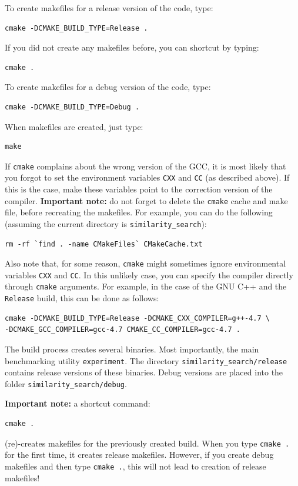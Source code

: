 \documentclass[runningheads,a4paper]{llncs}
\newcommand{\ttt}[1]{\texttt{#1}}
\begin{document}
{To create makefiles for a release version of the code, type:
\begin{verbatim}
cmake -DCMAKE_BUILD_TYPE=Release .
\end{verbatim}
If you did not create any makefiles before, you can shortcut by typing:
\begin{verbatim}
cmake . 
\end{verbatim}
To create makefiles for a debug version of the code, type:
\begin{verbatim}
cmake -DCMAKE_BUILD_TYPE=Debug .
\end{verbatim}
When makefiles are created, just type:
\begin{verbatim}
make
\end{verbatim}
If \ttt{cmake} complains about the wrong version of the GCC, 
it is most likely that you forgot to set the environment variables \ttt{CXX} and \ttt{CC} (as described above).
If this is the case, make these variables point to the correction version of the compiler.
\textbf{Important note:} 
do not forget to delete the \ttt{cmake} cache and make file, before recreating the makefiles.
For example, you can do the following (assuming the current directory is \ttt{similarity\_search}):
\begin{verbatim}
rm -rf `find . -name CMakeFiles` CMakeCache.txt
\end{verbatim}

Also note that, for some reason, \ttt{cmake} might sometimes ignore environmental variables \ttt{CXX} and \ttt{CC}.
In this unlikely case, you can specify the compiler directly through \ttt{cmake} arguments.
For example, in the case of the GNU C++ and the \ttt{Release} build, 
this can be done as follows:
\begin{verbatim}
cmake -DCMAKE_BUILD_TYPE=Release -DCMAKE_CXX_COMPILER=g++-4.7 \
-DCMAKE_GCC_COMPILER=gcc-4.7 CMAKE_CC_COMPILER=gcc-4.7 .
\end{verbatim} 

The build process creates several binaries. Most importantly,
the main benchmarking utility \ttt{experiment}.
The directory \ttt{similarity\_search/release} contains release versions of
these binaries. Debug versions are placed into the folder \ttt{similarity\_search/debug}.

\textbf{Important note:} a shortcut command:
\begin{verbatim}
cmake .
\end{verbatim} 
(re)-creates makefiles for the previously 
created build. When you type \ttt{cmake .} for the first time,
it creates release makefiles. However, if you create debug
makefiles and then type \ttt{cmake .}, 
this will not lead to creation of release makefiles! 

}
\end{document}
